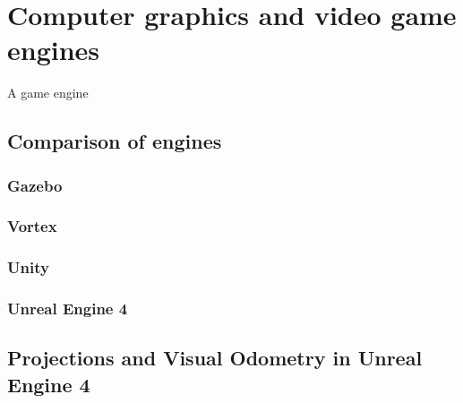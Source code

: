 
\chapter{Computer graphics and video game engines}

A game engine 


\section{Comparison of engines}



\subsection{Gazebo}

\subsection{Vortex} %

\subsection{Unity}

\subsection{Unreal Engine 4}

\section{Projections and Visual Odometry in Unreal Engine 4}

\cleardoublepage
